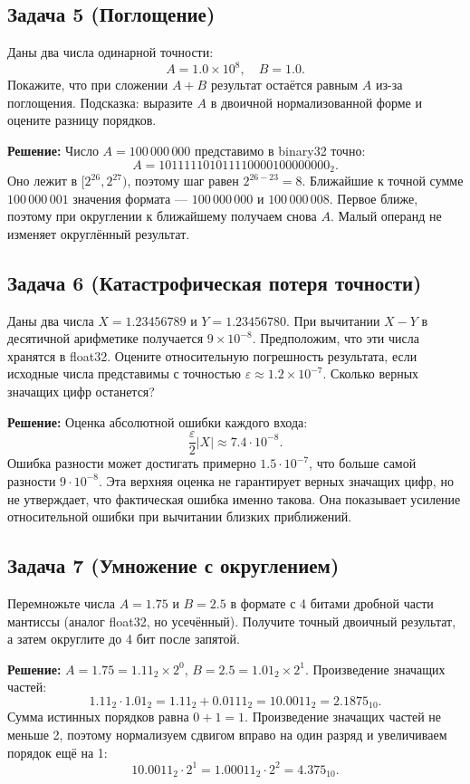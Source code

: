 \subsection*{Задача 5 (Поглощение)}
Даны два числа одинарной точности:
\[
A = 1.0 \times 10^8,\quad B = 1.0.
\]
Покажите, что при сложении $A + B$ результат остаётся равным $A$ из-за поглощения. Подсказка: выразите $A$ в двоичной нормализованной форме и оцените разницу порядков.

\textbf{Решение:}
Число $A=100\,000\,000$ представимо в binary32 точно:
\[A=101111101011110000100000000_2.\]
Оно лежит в $[2^{26},2^{27})$, поэтому шаг равен $2^{26-23}=8$.
Ближайшие к точной сумме $100\,000\,001$ значения формата ---
$100\,000\,000$ и $100\,000\,008$. Первое ближе, поэтому при округлении
к ближайшему получаем снова $A$. Малый операнд не изменяет округлённый результат.

\subsection*{Задача 6 (Катастрофическая потеря точности)}
Даны два числа $X = 1.23456789$ и $Y = 1.23456780$. При вычитании $X - Y$ в десятичной арифметике получается $9 \times 10^{-8}$. Предположим, что эти числа хранятся в float32. Оцените относительную погрешность результата, если исходные числа представимы с точностью $\varepsilon \approx 1.2\times10^{-7}$. Сколько верных значащих цифр останется?

\textbf{Решение:}
Оценка абсолютной ошибки каждого входа:
\[\frac{\varepsilon}{2}|X|\approx7.4\cdot10^{-8}.\]
Ошибка разности может достигать примерно $1.5\cdot10^{-7}$, что больше
самой разности $9\cdot10^{-8}$. Эта верхняя оценка не гарантирует верных
значащих цифр, но не утверждает, что фактическая ошибка именно такова.
Она показывает усиление относительной ошибки при вычитании близких приближений.

\subsection*{Задача 7 (Умножение с округлением)}
Перемножьте числа $A = 1.75$ и $B = 2.5$ в формате с 4 битами дробной части мантиссы (аналог float32, но усечённый). Получите точный двоичный результат, а затем округлите до 4 бит после запятой.

\textbf{Решение:}
$A = 1.75 = 1.11_2 \times 2^0$, $B = 2.5 = 1.01_2 \times 2^1$.
Произведение значащих частей:
\[
1.11_2\cdot1.01_2=1.11_2+0.0111_2=10.0011_2=2.1875_{10}.
\]
Сумма истинных порядков равна $0+1=1$. Произведение значащих частей
не меньше 2, поэтому нормализуем сдвигом вправо на один разряд и
увеличиваем порядок ещё на 1:
\[
10.0011_2\cdot2^1=1.00011_2\cdot2^2=4.375_{10}.
\]

